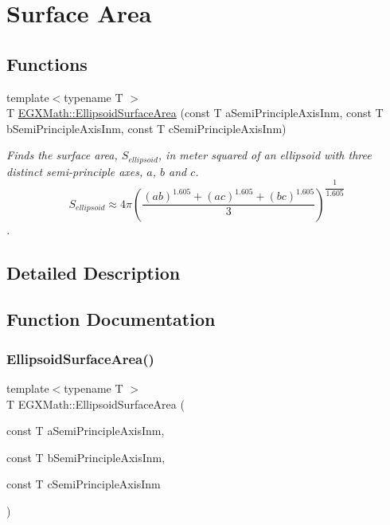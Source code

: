 \hypertarget{group___e_g_x_math-_geometry-3_d-_ellipsoid-_surface_area}{}\section{Surface Area}
\label{group___e_g_x_math-_geometry-3_d-_ellipsoid-_surface_area}
\subsection*{Functions}
\begin{DoxyCompactItemize}
\item 
{\footnotesize template$<$typename T $>$ }\\T \mbox{\hyperlink{group___e_g_x_math-_geometry-3_d-_ellipsoid-_surface_area_gae1dfe0a51a3adc5121de3ced76b4068c}{E\+G\+X\+Math\+::\+Ellipsoid\+Surface\+Area}} (const T a\+Semi\+Principle\+Axis\+Inm, const T b\+Semi\+Principle\+Axis\+Inm, const T c\+Semi\+Principle\+Axis\+Inm)
\begin{DoxyCompactList}\small\item\em Finds the surface area, $S_{ellipsoid}$, in meter squared of an ellipsoid with three distinct semi-\/principle axes, $a$, $b$ and $c$. \[ S_{ellipsoid} \approx 4 \pi \left ( \dfrac{(ab)^{1.605}+(ac)^{1.605}+(bc)^{1.605}}{3} \right )^{\dfrac{1}{1.605}} \]. \end{DoxyCompactList}\end{DoxyCompactItemize}


\subsection{Detailed Description}


\subsection{Function Documentation}
\mbox{\label{group___e_g_x_math-_geometry-3_d-_ellipsoid-_surface_area_gae1dfe0a51a3adc5121de3ced76b4068c}} 
\subsubsection{\texorpdfstring{Ellipsoid\+Surface\+Area()}{EllipsoidSurfaceArea()}}
{\footnotesize\ttfamily template$<$typename T $>$ \\
T E\+G\+X\+Math\+::\+Ellipsoid\+Surface\+Area (\begin{DoxyParamCaption}\item[{const T}]{a\+Semi\+Principle\+Axis\+Inm,  }\item[{const T}]{b\+Semi\+Principle\+Axis\+Inm,  }\item[{const T}]{c\+Semi\+Principle\+Axis\+Inm }\end{DoxyParamCaption})}



